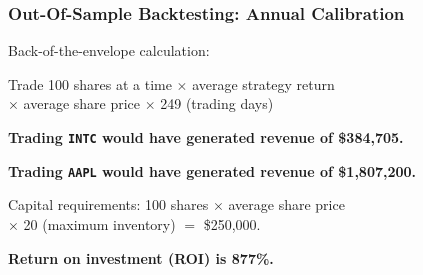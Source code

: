 \begin{frame}
\frametitle{Out-Of-Sample Backtesting: Annual Calibration}
Back-of-the-envelope calculation: \par
\vspace{\baselineskip}
Trade 100 shares at a time $\times$ average strategy return \\
$\times$ average share price $\times$ 249 (trading days)
\begin{center}
{\bf Trading \texttt{INTC} would have generated revenue of \$384,705.} \par
{\bf Trading \texttt{AAPL} would have generated revenue of \$1,807,200.}
\end{center}
Capital requirements: 100 shares $\times$ average share price \\ $\times$ 20 (maximum inventory) $=$ \$250,000. 
\begin{center}
{\bf Return on investment (ROI) is 877\%.}
\end{center}
\end{frame}